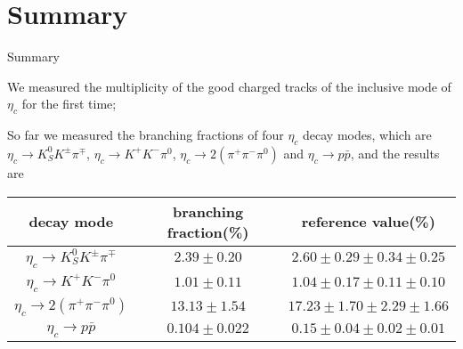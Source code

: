 \documentclass{beamer}
\begin{document}
\section{Summary}
\begin{frame}{Summary}
  \begin{block}{}
    We measured the multiplicity of the good charged tracks of the inclusive mode of $\eta_c$ for the first time;
  \end{block}
  \begin{block}{}
    So far we measured the branching fractions of four $\eta_c$ decay modes, which are $\eta_c\to K_S^0 K^{\pm} \pi^{\mp}$, $\eta_c\to K^+K^-\pi^0$, $\eta_c\to 2(\pi^+\pi^-\pi^0)$ and $\eta_c\to p\bar{p}$, and the results are
    \begin{table}[~hbp]\small
      \begin{tabular}{c|c|c}
        \hline
        \hline
        decay mode & branching fraction(\%) & reference value(\%) \footnotemark[1] \\
        \hline
        $\eta_c\to K_S^0K^{\pm}\pi^{\mp}$ & $2.39\pm0.20$ & $2.60\pm0.29\pm0.34\pm0.25$ \\
        $\eta_c\to K^+ K^- \pi^0$ & $1.01\pm0.11$ & $ 1.04\pm0.17\pm0.11\pm0.10$ \\
        $\eta_c\to2(\pi^+\pi^-\pi^0)$ & $13.13\pm1.54$ & $17.23\pm1.70\pm2.29\pm1.66$ \\
        $\eta_c\to p\bar{p}$ & $0.104\pm 0.022$  & $0.15\pm0.04\pm0.02\pm0.01$ \\
        \hline
        \hline
      \end{tabular}
    \end{table}
  \end{block}
\end{frame}
\end{document}
